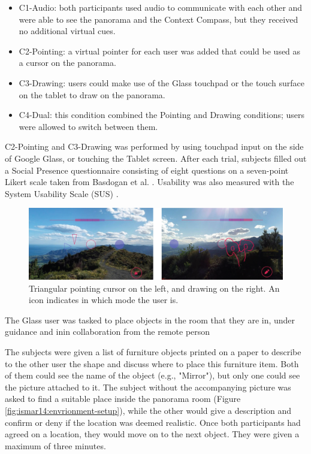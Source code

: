 \begin{itemize}
    \item C1-Audio: both participants used audio to communicate with each other and were able to see the panorama and the Context Compass, but they received no additional virtual cues. 
    \item C2-Pointing: a virtual pointer for each user was added that could be used as a cursor on the panorama.
    \item C3-Drawing: users could make use of the Glass touchpad or the touch surface on the tablet to draw on the panorama. 
    \item C4-Dual: this condition combined the Pointing and Drawing conditions; users were allowed to switch between them.
\end{itemize}{}

C2-Pointing and C3-Drawing was performed by using touchpad input on the side of Google Glass, or touching the Tablet screen. After each trial, subjects filled out a Social Presence questionnaire consisting of eight questions on a seven-point Likert scale taken from Basdogan et al. \cite{Basdogan2001}. Usability was also measured with the System Usability Scale (SUS) \cite{brooke1996sus}.

\begin{figure}
    \centering
    \includegraphics[width=\linewidth]{images/63-pano-ismar14/pointing-drawing}
    \caption{Triangular pointing cursor on the left, and drawing on the right. An icon indicates in which mode the user is.}
    \label{fig:ismar14:pointing-drawing}
\end{figure}

The Glass user was tasked to place objects in the room that they are in, under guidance and inin collaboration from the remote person

The subjects were given a list of furniture objects printed on a paper to describe to the other user the shape and discuss where to place this furniture item. Both of them could see the name of the object (e.g., "Mirror"), but only one could see the picture attached to it. The subject without the accompanying picture was asked to find a suitable place inside the panorama room (Figure \ref{fig:ismar14:envrionment-setup}), while the other would give a description and confirm or deny if the location was deemed realistic. Once both participants had agreed on a location, they would move on to the next object. They were given a maximum of three minutes.

